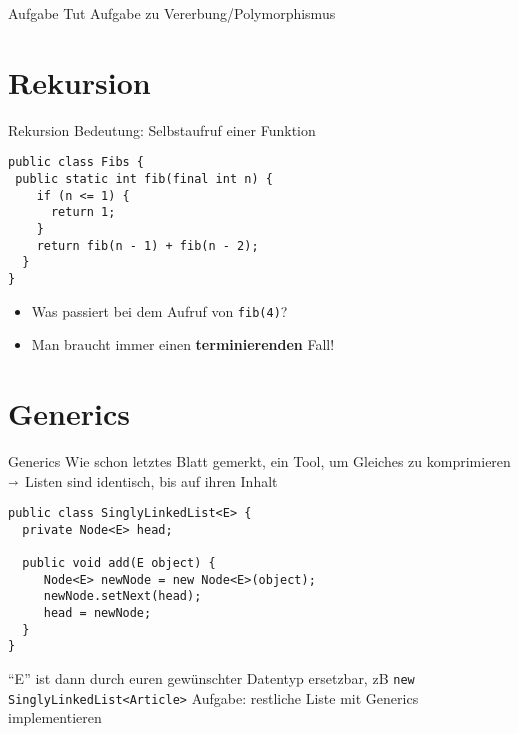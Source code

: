 \documentclass[18pt]{beamer}
\begin{document}
\begin{frame}[fragile]{Aufgabe}
Tut Aufgabe zu Vererbung/Polymorphismus
\end{frame}


\section{Rekursion}
\begin{frame}[fragile]{Rekursion}
Bedeutung: Selbstaufruf einer Funktion \pause
\begin{lstlisting}
public class Fibs {
 public static int fib(final int n) {
    if (n <= 1) {
      return 1;
    }
    return fib(n - 1) + fib(n - 2);
  }
}
\end{lstlisting} \pause
\begin{itemize}
	\item Was passiert bei dem Aufruf von \lstinline{fib(4)}? \pause
	\item Man braucht immer einen \textbf{terminierenden} Fall! 
\end{itemize}
\end{frame}

\section{Generics}
\begin{frame}[fragile]{Generics}
Wie schon letztes Blatt gemerkt, ein Tool, um Gleiches zu komprimieren
$\shortrightarrow$ Listen sind identisch, bis auf ihren Inhalt \pause
\begin{lstlisting}
public class SinglyLinkedList<E> {
  private Node<E> head;

  public void add(E object) {
     Node<E> newNode = new Node<E>(object);
     newNode.setNext(head);
     head = newNode;
  }
}
\end{lstlisting} \pause
"`E"' ist dann durch euren gewünschter Datentyp ersetzbar, zB \lstinline{new SinglyLinkedList<Article>} \newline \pause
Aufgabe: restliche Liste mit Generics implementieren
\end{frame}


\appendix
\beginbackup


\backupend
\end{document}
